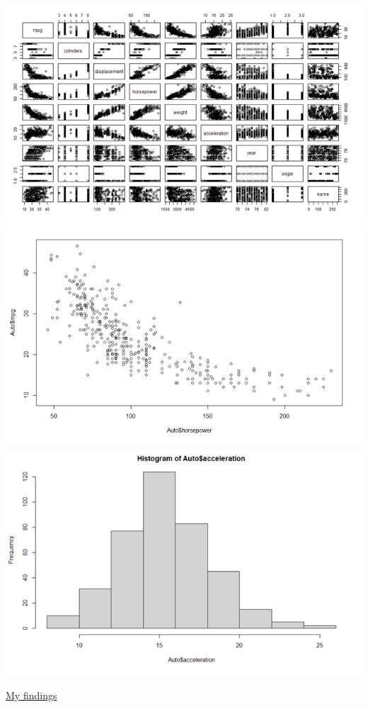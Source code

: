 \documentclass{article}
\begin{document}
\begin{center}
    \includegraphics[scale = 0.6]{3.9.e-2.png} 
    \includegraphics[scale = 0.6]{3.9.e-3.png} 
    \includegraphics[scale = 0.6]{3.9.e-4.png} 
\end{center}
\underline{My findings} 
\end{document}
